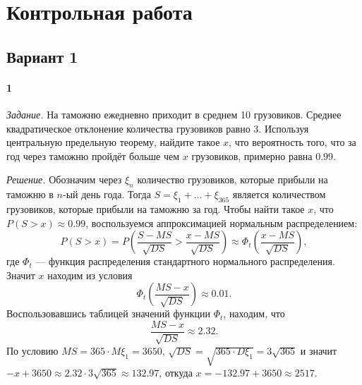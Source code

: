 \chapter*{Контрольная работа}

\section*{Вариант 1}

\subsubsection*{1}

\textit{Задание.} На таможню ежедневно приходит в среднем 10 грузовиков.
Среднее квадратическое отклонение количества грузовиков равно 3.
Используя центральную предельную теорему, найдите такое $x$, что вероятность того,
что за год через таможню пройдёт больше чем $x$ грузовиков, примерно равна $0.99$.

\textit{Решение.}
Обозначим через $ \xi_n$ количество грузовиков, которые прибыли на таможню в $n$-ый день года.
Тогда $S = \xi_1 + \dotsc + \xi_{365}$ является количеством грузовиков,
которые прибыли на таможню за год.
Чтобы найти такое $x$, что $P \left( S > x \right) \approx 0.99$,
воспользуемся аппроксимацией нормальным распределением:
$$P \left( S > x \right) =
  P \left( \frac{S - MS}{ \sqrt{DS}} > \frac{x - MS}{ \sqrt{DS}} \right) \approx
  \Phi_t \left( \frac{x - MS}{ \sqrt{DS}} \right),$$
где $ \Phi_t$ --- функция распределения стандартного нормального распределения.
Значит $x$ находим из условия
$$ \Phi_t \left( \frac{MS - x}{ \sqrt{DS}} \right) \approx
  0.01.$$
Воспользовавшись таблицей значений функции $ \Phi_t$, находим, что
$$ \frac{MS - x}{ \sqrt{DS}} \approx
  2.32.$$
По условию $MS = 365 \cdot M \xi_1 = 3650, \, \sqrt{DS} = \sqrt{365 \cdot D \xi_1} = 3 \sqrt{365}$
и значит $-x + 3650 \approx 2.32 \cdot 3 \sqrt{365} \approx 132.97$,
откуда $x = -132.97 + 3650 \approx 2517$.
